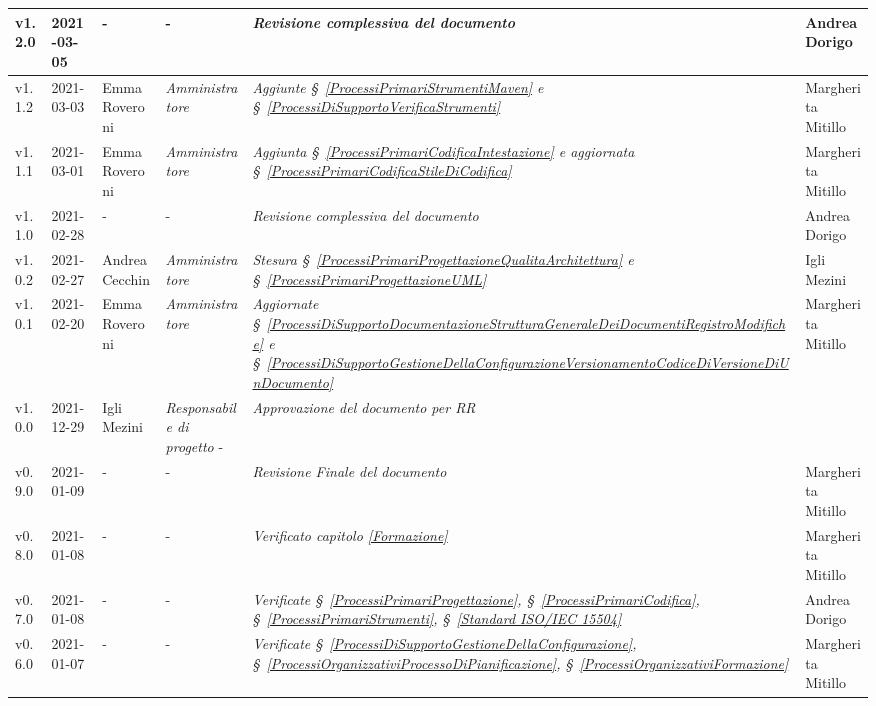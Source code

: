 {\begin{center}
\begin{longtable}[c]{|p{2cm-1\tabcolsep}|p{2cm}|p{3cm-2\tabcolsep}|p{3cm-1.5\tabcolsep}|p{}|p{3cm-2\tabcolsep}|}
		\hline
		\centering v1.2.0 & 2021-03-05 & \centering - & \centering - & \textit{Revisione complessiva del documento} & Andrea Dorigo  \\
		\hline
		\centering v1.1.2 & 2021-03-03 & Emma Roveroni & \centering \textit{Amministratore}  & \textit{Aggiunte \S~\ref{ProcessiPrimariStrumentiMaven} e \S~\ref{ProcessiDiSupportoVerificaStrumenti} } & Margherita Mitillo \\
		\hline
		\centering v1.1.1 & 2021-03-01 & Emma Roveroni & \centering \textit{Amministratore} & \textit{Aggiunta  \S~\ref{ProcessiPrimariCodificaIntestazione} e aggiornata  \S~\ref{ProcessiPrimariCodificaStileDiCodifica} } & Margherita Mitillo  \\
		\hline
		\centering v1.1.0 & 2021-02-28 & \centering - & \centering - & \textit{Revisione complessiva del documento}   & Andrea Dorigo \\
		\hline
		\centering v1.0.2 & 2021-02-27 & Andrea Cecchin & \centering \textit{Amministratore}  & \textit{Stesura  \S~\ref{ProcessiPrimariProgettazioneQualitaArchitettura} e \S~\ref{ProcessiPrimariProgettazioneUML}} & Igli Mezini \\
		\hline
		\centering v1.0.1 & 2021-02-20 & Emma Roveroni & \centering \textit{Amministratore}  & \textit{Aggiornate  \S~\ref{ProcessiDiSupportoDocumentazioneStrutturaGeneraleDeiDocumentiRegistroModifiche} e \S~\ref{ProcessiDiSupportoGestioneDellaConfigurazioneVersionamentoCodiceDiVersioneDiUnDocumento}} & Margherita Mitillo \\
		\hline
		\centering v1.0.0 & 2021-12-29 & Igli Mezini & \centering \textit{Responsabile di progetto}  - & \textit{Approvazione del documento per RR} & \makecell[c]{-} \\
		\hline
		\centering v0.9.0 & 2021-01-09 & \centering - & \centering -  & \textit{Revisione Finale del documento} & Margherita Mitillo\\
		\hline
		\centering v0.8.0 & 2021-01-08 & \centering - & \centering -  & \textit{Verificato capitolo \ref{Formazione}} & Margherita Mitillo \\
		\hline
		\centering v0.7.0 & 2021-01-08 & \centering - & \centering -  & \textit{Verificate  \S~\ref{ProcessiPrimariProgettazione}, \S~\ref{ProcessiPrimariCodifica}, \S~\ref{ProcessiPrimariStrumenti}, \S~\ref{Standard ISO/IEC 15504} } & Andrea Dorigo \\
		\hline
		\centering v0.6.0 & 2021-01-07 & \centering - & \centering -  & \textit{Verificate  \S~\ref{ProcessiDiSupportoGestioneDellaConfigurazione}, \S~\ref{ProcessiOrganizzativiProcessoDiPianificazione}, \S~\ref{ProcessiOrganizzativiFormazione}} & Margherita Mitillo \\

\end{longtable}
\end{center}}

